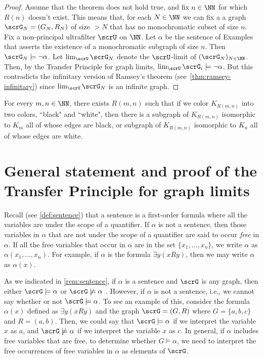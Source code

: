 \begin{proof}
  Assume that the theorem does not hold true, and fix $n \in \NN$ for which $R(n)$ doesn’t exist.
  This means that, for each $N \in \NN$ we can fix a a graph $\scrG_N=(G_N, R_N)$ of size $> N$ that has  no monochromatic subset of size $n$.
  Fix a non-principal ultrafilter $\scrU$ on $\NN$.
  Let $\alpha$ be the sentence of Examples \label{exa:ramsey-first-order} that asserts the existence of a monochromatic subgraph of size $n$.
  Then $\scrG_N\models \neg\alpha$.
  Let $\lim_{\scrU} \scrG_N$ denote the $\scrU$-limit of  $(\scrG_N)_{N\in\NN}$.
  Then, by the Transfer Principle for graph limits, $\lim_{\scrU} \scrG_i\models\neg\alpha$.
  But this contradicts  the infinitary version of Ramsey’s theorem (see~\ref{thm:ramsey-infinitary}) since $\lim_{\scrU} \scrG_N$  is an infinite graph.
\end{proof}

\begin{exercise}
  For every $m, n \in \NN$, there exists $R(m,n)$ such that if we color
  $K_{R(m,n)}$ into two colors, “black" and “white", then there is a subgraph of $K_{R(m,n)}$ isomorphic to $K_m$ all of whose edges are black, or subgraph of $K_{R(m,n)}$ isomorphic to $K_n$ all of whose edges are white.
\end{exercise}

\section{General statement and proof of the Transfer Principle for graph limits}

Recall (see \cref{def:sentence}) that a sentence is a first-order formula where all the variables are under the scope of a quantifier.
If $\alpha$ is not a sentence, then those variables in $\alpha$ that are not under the scope of a quantifier are said to occur \emph{free} in $\alpha$.
If all the free variables that occur in $\alpha$ are in the set $\{x_1,\dots, x_n\}$, we write $\alpha$ as $\alpha(x_1,\dots, x_n)$.
For example, if $\alpha$ is the formula $\exists y(xRy)$, then we may write $\alpha$ as $\alpha(x)$.

As we indicated in \cref{rem:sentence}, if $\alpha$ is a sentence and $\scrG$ is any graph, then either $\scrG\models \alpha$ or $\scrG\not\models \alpha$ .
However, if $\alpha$ is not a sentence, i.e., we cannot say whether or not $\scrG\models \alpha$.
To see an example of this, consider the formula $\alpha(x)$ defined as  $\exists y(xRy)$ and the graph $\scrG=(G,R)$ where $G=\{a, b, c\}$ and $R=(a, b)$.
Then, we could say that $\scrG\models \alpha$ if we interpret the variable $x$ as $a$, and $\scrG\not\models \alpha$ if we interpret the variable $x$ as $c$.
In general, if $\alpha$ includes free variables that are free, to determine whether $G\models \alpha$, we need to interpret the free occurrences of free variables in $\alpha$ as elements of $\scrG$.

